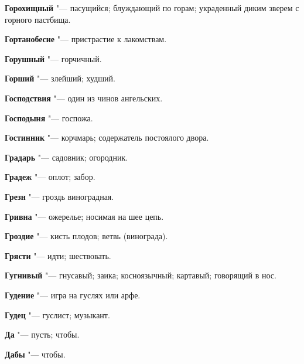 \begin{mymulticols}{2}
\noindent\textbf{Горохищный} "--- пасущийся; блуждающий по горам; украденный диким зверем с горного пастбища. 




\noindent\textbf{Гортанобесие} "--- пристрастие к лакомствам. 




\noindent\textbf{Горушный} "--- горчичный. 




\noindent\textbf{Горший} "--- злейший; худший. 




\noindent\textbf{Господствия} "--- один из чинов ангельских. 




\noindent\textbf{Господыня} "--- госпожа. 




\noindent\textbf{Гостинник} "--- корчмарь; содержатель постоялого двора. 




\noindent\textbf{Градарь} "--- садовник; огородник. 




\noindent\textbf{Градеж} "--- оплот; забор. 




\noindent\textbf{Грезн} "--- гроздь виноградная. 




\noindent\textbf{Гривна} "--- ожерелье; носимая на шее цепь. 




\noindent\textbf{Гроздие} "--- кисть плодов; ветвь (винограда). 




\noindent\textbf{Грясти} "--- идти; шествовать. 




\noindent\textbf{Гугнивый} "--- гнусавый; заика; косноязычный; картавый; говорящий в нос. 




\noindent\textbf{Гудение} "--- игра на гуслях или арфе. 




\noindent\textbf{Гудец} "--- гуслист; музыкант. 









\noindent\textbf{Да} "--- пусть; чтобы. 




\noindent\textbf{Дабы} "--- чтобы. 





\end{mymulticols}
